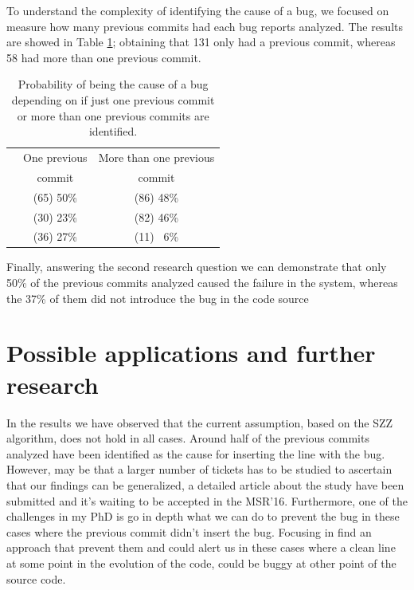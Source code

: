 \documentclass[ifip]{svmult}
\begin{document}
To understand the complexity of identifying the cause of a bug, we focused on measure how many previous commits had each bug reports analyzed. The results are showed in Table \ref{tab:secondStage}; obtaining that 131 only had a previous commit, whereas 58 had more than one previous commit. 

\begin{table}[htb]
\begin{center} {\footnotesize
\begin{tabular}{lcc}
\toprule[0.3mm]
  & \multicolumn{1}{c}{One previous } & \multicolumn{1}{c}{More than one previous} \\
  & \multicolumn{1}{c}{commit} & \multicolumn{1}{c}{commit} \\\hline
\raisebox{1ex}{Cause}     & (65) 50\% & (86) 48\% \\[0ex]
\raisebox{1ex}{Not cause} & (30) 23\% & (82) 46\% \\[0ex]
\raisebox{1ex}{Undecided} & (36) 27\% & (11) ~6\% \\[0ex]
\bottomrule[0.3mm]
\end{tabular} }
\caption{Probability of being the cause of a bug depending on if just one previous commit or more than one previous commits are identified.}
\label{tab:secondStage}
\end{center}
\end{table}

Finally, answering the second research question we can demonstrate that only 50\% of the previous commits analyzed caused the failure in the system, whereas the 37\% of them did not introduce the bug in the code source 

\section{Possible applications and further research}
\label{sec:discussion}

In the results we have observed that the current assumption, based on the SZZ algorithm, does not hold in all cases. Around half of the previous commits analyzed have been identified as the cause for inserting the line with the bug. However, may be that a larger number of tickets has to be studied to ascertain that our findings can be generalized, a detailed article about the study have been submitted and it's waiting to be accepted in the MSR'16. Furthermore, one of the challenges in my PhD is go in depth what we can do to prevent the bug in these cases where the previous commit didn't insert the bug. Focusing in find an approach that prevent them and could alert us in these cases where a clean line at some point in the evolution of the code, could be buggy at other point of the source code. 
\end{document}
